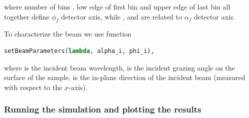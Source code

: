 \noindent where number of bins , low edge of first bin  and
upper edge of last bin  all together define $\phi_f$ detector axis,
while ,  and  are related to
$\alpha_f$ detector axis.




\noindent To characterize the beam we use function
\begin{lstlisting}[language=python, style=eclipse,numbers=none]
setBeamParameters(lambda, alpha_i, phi_i),
\end{lstlisting}

\noindent where  is the incident beam wavelength,
 is the incident
grazing angle on the surface of the sample,
 is the in-plane
direction of the incident beam (measured with respect to the $x$-axis).


\subsubsection{Running the simulation and plotting the results}

